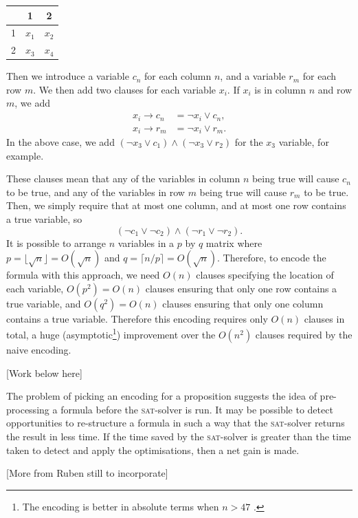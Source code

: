 \documentclass[proof,pdftex,11pt,a4,titlepage]{article}
\newcommand{\sat}{\textsc{sat}}
\begin{document}
\begin{center}
  \begin{tabular}{c|cc}
      & 1 & 2 \\ \hline
    1 & $x_1$ & $x_2$ \\
    2 & $x_3$ & $x_4$
  \end{tabular}
\end{center}

Then we introduce a variable $c_n$ for each column $n$, and a variable $r_m$ for each row $m$. We then add two clauses for each variable $x_i$. If $x_i$ is in column $n$ and row $m$, we add
\begin{align*}
  x_i \to c_n &= \neg x_i \vee c_n, \\
  x_i \to r_m &= \neg x_i \vee r_m.
\end{align*}
In the above case, we add $(\neg x_3 \vee c_1) \wedge (\neg x_3 \vee r_2)$ for the $x_3$ variable, for example.

These clauses mean that any of the variables in column $n$ being true will cause $c_n$ to be true, and any of the variables in row $m$ being true will cause $r_m$ to be true. Then, we simply require that at most one column, and at most one row contains a true variable, so
\[(\neg c_1 \vee \neg c_2) \wedge (\neg r_1 \vee \neg r_2).\]
It is possible to arrange $n$ variables in a $p$ by $q$ matrix where $p = \lfloor \sqrt{n} \rfloor = O(\sqrt{n})$ and $q = \lceil n / p \rceil = O(\sqrt{n})$. Therefore, to encode the formula with this approach, we need $O(n)$ clauses specifying the location of each variable, $O(p^2)=O(n)$ clauses ensuring that only one row contains a true variable, and $O(q^2)=O(n)$ clauses ensuring that only one column contains a true variable. Therefore this encoding requires only $O(n)$ clauses in total, a huge (asymptotic\footnote{The encoding is better in absolute terms when $n>47$ \cite{Biere:2014}.}) improvement over the $O(n^2)$ clauses required by the naive encoding.

[Work below here]

The problem of picking an encoding for a proposition suggests the idea of pre-processing a formula before the \sat{}-solver is run. It may be possible to detect opportunities to re-structure a formula in such a way that the \sat{}-solver returns the result in less time. If the time saved by the \sat{}-solver is greater than the time taken to detect and apply the optimisations, then a net gain is made.

[More from Ruben still to incorporate]
\end{document}

